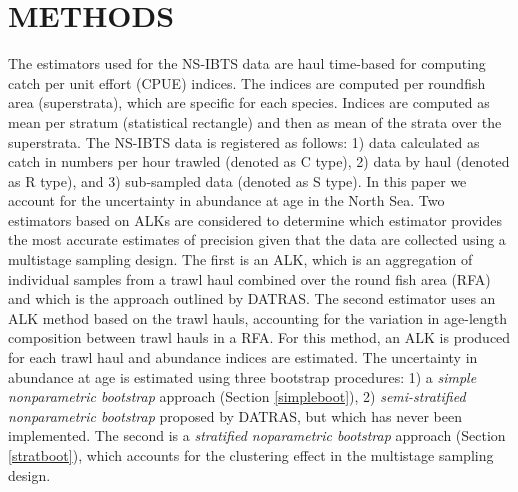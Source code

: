 \documentclass[a4paper 12pt]{article}
\numberwithin{equation}{section}
\begin{document}
\section{\large METHODS}
\label{methods}
The estimators used for the NS-IBTS data are haul time-based for computing catch per unit effort (CPUE) indices. The indices are computed per roundfish area (superstrata), which are specific for each species. Indices are computed as mean per stratum (statistical rectangle) and then as mean of the strata  over the superstrata. The NS-IBTS data is registered as follows: 1) data calculated as catch in  numbers per hour trawled (denoted as C type), 2) data by haul (denoted as R type), and 3) sub-sampled data (denoted as S type). In this paper we account for the uncertainty in abundance at age in the North Sea. Two estimators based on ALKs are considered to determine which estimator provides the most accurate estimates of precision given that the data are collected using a multistage sampling design. The first is an ALK, which is an aggregation of individual samples from a trawl haul combined over the round fish area (RFA) and which is the approach outlined by DATRAS. The second estimator uses an ALK method based on the trawl hauls, accounting for the variation in age-length composition between trawl hauls in a RFA. For this method, an ALK is produced for each trawl haul and abundance indices are estimated. The uncertainty in abundance at age is estimated using three bootstrap procedures: 1) a \emph{simple nonparametric bootstrap} approach (Section \ref{simpleboot}), 2) \emph{semi-stratified nonparametric bootstrap}  proposed by DATRAS, but which has never been implemented. The second is a \emph{stratified noparametric bootstrap} approach (Section \ref{stratboot}), which accounts for the clustering effect in the multistage sampling design. 

\end{document}
